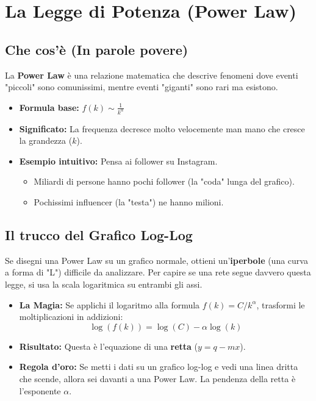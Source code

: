 \documentclass{article}
\begin{document}
\section{La Legge di Potenza (Power Law)}
  \subsection{Che cos'è (In parole povere)}
    La \textbf{Power Law} è una relazione matematica che descrive fenomeni dove eventi "piccoli" sono comunissimi, mentre eventi "giganti" sono rari ma esistono.
    \begin{itemize}
        \item \textbf{Formula base:} $f(k) \sim \frac{1}{k^\alpha}$
        \item \textbf{Significato:} La frequenza decresce molto velocemente man mano che cresce la grandezza ($k$).
        \item \textbf{Esempio intuitivo:} Pensa ai follower su Instagram.
        \begin{itemize}
            \item Miliardi di persone hanno pochi follower (la "coda" lunga del grafico).
            \item Pochissimi influencer (la "testa") ne hanno milioni.
        \end{itemize}
    \end{itemize}
  \subsection{Il trucco del Grafico Log-Log}
    Se disegni una Power Law su un grafico normale, ottieni un'\textbf{iperbole} (una curva a forma di "L") difficile da analizzare.
    Per capire se una rete segue davvero questa legge, si usa la scala logaritmica su entrambi gli assi.
    \begin{itemize}
        \item \textbf{La Magia:} Se applichi il logaritmo alla formula $f(k) = C/k^\alpha$, trasformi le moltiplicazioni in addizioni:
          $$ \log(f(k)) = \log(C) - \alpha \log(k) $$
        \item \textbf{Risultato:} Questa è l'equazione di una \textbf{retta} ($y = q - mx$).
        \item \textbf{Regola d'oro:} Se metti i dati su un grafico log-log e vedi una linea dritta che scende, allora sei davanti a una Power Law. La pendenza della retta è l'esponente $\alpha$.
    \end{itemize}
\end{document}
